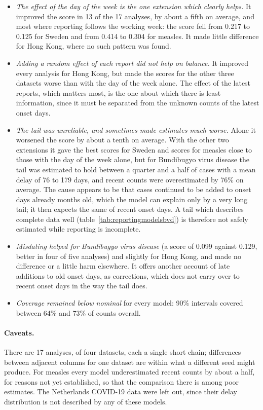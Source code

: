 \documentclass[11pt,a4paper]{article}
\begin{document}
\begin{itemize}[itemsep=2pt]
\item \emph{The effect of the day of the week is the one extension which
clearly helps.} It improved the score in 13 of the 17 analyses, by about a
fifth on average, and most where reporting follows the working week: the score
fell from 0.217 to 0.125 for Sweden and from 0.414 to 0.304 for measles. It
made little difference for Hong Kong, where no such pattern was found.
\item \emph{Adding a random effect of each report did not help on balance.} It
improved every analysis for Hong Kong, but made the scores for the other three
datasets worse than with the day of the week alone. The effect of the latest
reports, which matters most, is the one about which there is least
information, since it must be separated from the unknown counts of the latest
onset days.
\item \emph{The tail was unreliable, and sometimes made estimates much
worse.} Alone it worsened the score by about a tenth on average. With the
other two extensions it gave the best scores for Sweden and scores for measles
close to those with the day of the week alone, but for Bundibugyo virus
disease the tail was estimated to hold between a quarter and a half of cases
with a mean delay of 76 to 179 days, and recent counts were overestimated by
76\% on average. The cause appears to be that cases continued to be added to
onset days already months old, which the model can explain only by a very long
tail; it then expects the same of recent onset days. A tail which describes
complete data well (table~\ref{tab:reportingmodelsbvd}) is therefore not
safely estimated while reporting is incomplete.
\item \emph{Misdating helped for Bundibugyo virus disease} (a score of 0.099
against 0.129, better in four of five analyses) and slightly for Hong Kong,
and made no difference or a little harm elsewhere. It offers another account
of late additions to old onset days, as corrections, which does not carry over
to recent onset days in the way the tail does.
\item \emph{Coverage remained below nominal} for every model: 90\% intervals
covered between 64\% and 73\% of counts overall.
\end{itemize}

\paragraph{Caveats.} There are 17 analyses, of four datasets, each a single
short chain; differences between adjacent columns for one dataset are within
what a different seed might produce. For measles every model underestimated
recent counts by about a half, for reasons not yet established, so that the
comparison there is among poor estimates. The Netherlands COVID-19 data were
left out, since their delay distribution is not described by any of these
models.
\end{document}
